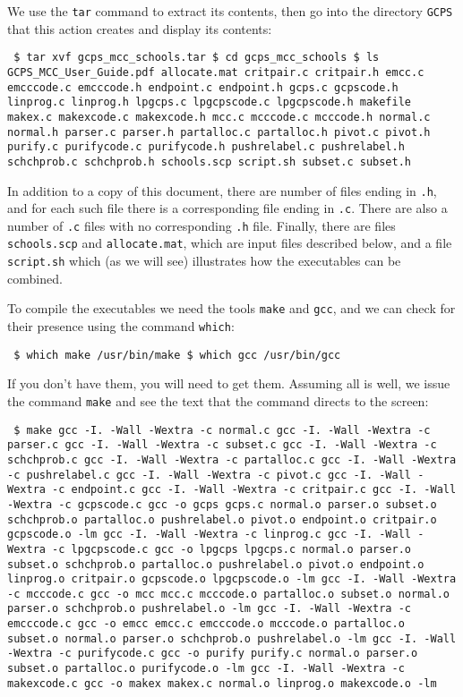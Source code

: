 \documentclass[12pt]{article}
\theoremstyle{definition}
\begin{document}
We use the \texttt{tar} command to extract its contents, then go into
the directory \texttt{GCPS} that this action creates and display its
contents:
\begin{obeylines}
  \texttt{
    \$ tar xvf gcps\_mcc\_schools.tar
    \$ cd gcps\_mcc\_schools
    \$ ls
GCPS\_MCC\_User\_Guide.pdf allocate.mat critpair.c critpair.h              
emcc.c emcccode.c emcccode.h endpoint.c
endpoint.h gcps.c gcpscode.h linprog.c
linprog.h lpgcps.c lpgcpscode.c lpgcpscode.h
makefile makex.c makexcode.c makexcode.h
mcc.c mcccode.c mcccode.h normal.c
normal.h parser.c parser.h partalloc.c
partalloc.h pivot.c pivot.h purify.c
purifycode.c purifycode.h pushrelabel.c pushrelabel.h
schchprob.c schchprob.h schools.scp script.sh
subset.c subset.h
    }
\end{obeylines}
\bigskip
In addition to a copy of this document, there are number of files
ending in \texttt{.h}, and for each such file there is a corresponding
file ending in \texttt{.c}.  There are also a number of \texttt{.c}
files with no corresponding \texttt{.h} file.  Finally, there are
files \texttt{schools.scp} and \texttt{allocate.mat}, which are input
files described below, and a file \texttt{script.sh} which (as we
will see) illustrates how the executables can be combined.

To compile the executables we need the tools \texttt{make} and
\texttt{gcc}, and we can check for their presence using
the command \texttt{which}:
\begin{obeylines}
  \texttt{
    \$ which make
    /usr/bin/make
    \$ which gcc
    /usr/bin/gcc
    }
\end{obeylines}
\bigskip \noindent If you don't have them, you will need to get them.
Assuming all is well, we issue the command \texttt{make} and see the
text that the command directs to the screen:
\begin{obeylines}
  \texttt{
    \$ make
gcc -I. -Wall -Wextra  -c normal.c 
gcc -I. -Wall -Wextra  -c parser.c
gcc -I. -Wall -Wextra  -c subset.c
gcc -I. -Wall -Wextra  -c schchprob.c
gcc -I. -Wall -Wextra  -c partalloc.c
gcc -I. -Wall -Wextra  -c pushrelabel.c
gcc -I. -Wall -Wextra  -c pivot.c 
gcc -I. -Wall -Wextra  -c endpoint.c
gcc -I. -Wall -Wextra  -c critpair.c
gcc -I. -Wall -Wextra  -c gcpscode.c
gcc -o gcps gcps.c normal.o parser.o subset.o schchprob.o partalloc.o pushrelabel.o pivot.o endpoint.o critpair.o gcpscode.o -lm
gcc -I. -Wall -Wextra  -c linprog.c 
gcc -I. -Wall -Wextra  -c lpgcpscode.c
gcc -o lpgcps lpgcps.c normal.o parser.o subset.o schchprob.o partalloc.o pushrelabel.o pivot.o endpoint.o linprog.o critpair.o gcpscode.o lpgcpscode.o -lm
gcc -I. -Wall -Wextra  -c mcccode.c
gcc -o mcc mcc.c mcccode.o partalloc.o subset.o normal.o parser.o schchprob.o pushrelabel.o  -lm
gcc -I. -Wall -Wextra  -c emcccode.c
gcc -o emcc emcc.c emcccode.o mcccode.o partalloc.o subset.o normal.o parser.o schchprob.o pushrelabel.o -lm
gcc -I. -Wall -Wextra  -c purifycode.c
gcc -o purify purify.c normal.o parser.o subset.o partalloc.o purifycode.o -lm
gcc -I. -Wall -Wextra  -c makexcode.c
gcc -o makex makex.c normal.o linprog.o makexcode.o -lm
    } 
\end{obeylines}
\bigskip
\end{document}

